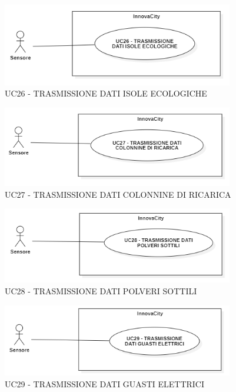 
\begin{figure}[H]
    \centering
    \includegraphics[width=0.9\textwidth]{../Images/uc26.PNG}
    \caption{UC26 - TRASMISSIONE DATI ISOLE ECOLOGICHE}
\end{figure}

\begin{figure}[H]
    \centering
    \includegraphics[width=0.9\textwidth]{../Images/uc27.PNG}
    \caption{UC27 - TRASMISSIONE DATI COLONNINE DI RICARICA}
\end{figure}

\begin{figure}[H]
    \centering
    \includegraphics[width=0.9\textwidth]{../Images/uc28.PNG}
    \caption{UC28 - TRASMISSIONE DATI POLVERI SOTTILI}
\end{figure}

\begin{figure}[H]
    \centering
    \includegraphics[width=0.9\textwidth]{../Images/uc29.PNG}
    \caption{UC29 - TRASMISSIONE DATI GUASTI ELETTRICI}
\end{figure}


\setcounter{rowcounter}{1}
